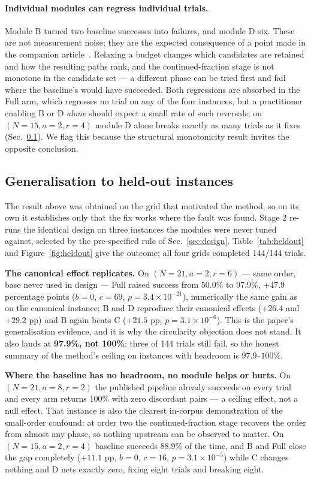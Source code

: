 \documentclass[preprint,11pt]{elsarticle}
\begin{document}
\paragraph{Individual modules can regress individual trials.} Module B
turned two baseline successes into failures, and module D six. These are
not measurement noise; they are the expected consequence of a point made
in the companion article~\cite{methodpaper}. Relaxing a budget changes which
candidates are retained and how the resulting paths rank, and the
continued-fraction stage is not monotone in the candidate set --- a
different phase can be tried first and fail where the baseline's would
have succeeded. Both regressions are absorbed in the Full arm, which
regresses no trial on any of the four instances, but a practitioner
enabling B or D \emph{alone} should expect a small rate of such
reversals; on $(N{=}15,a{=}2,r{=}4)$ module D alone breaks exactly as
many trials as it fixes (Sec.~\ref{sec:heldout}). We flag this because
the structural monotonicity result invites the opposite conclusion.

\subsection{Generalisation to held-out instances}
\label{sec:heldout}

The result above was obtained on the grid that motivated the method, so
on its own it establishes only that the fix works where the fault was
found. Stage 2 re-runs the identical design on three instances the
modules were never tuned against, selected by the pre-specified rule of
Sec.~\ref{sec:design}. Table~\ref{tab:heldout} and
Figure~\ref{fig:heldout} give the outcome; all four grids completed
144/144 trials.

\textbf{The canonical effect replicates.} On $(N{=}21,a{=}2,r{=}6)$ ---
same order, base never used in design --- Full raised success from 50.0\%
to 97.9\%, $+47.9$ percentage points ($b{=}0$, $c{=}69$,
$p=3.4\times10^{-21}$), numerically the same gain as on the canonical
instance; B and D reproduce their canonical effects ($+26.4$ and
$+29.2$ pp) and B again beats C ($+21.5$ pp, $p=3.1\times10^{-6}$). This
is the paper's generalisation evidence, and it is why the circularity
objection does not stand. It also lands at \textbf{97.9\%, not 100\%}:
three of 144 trials still fail, so the honest summary of the method's
ceiling on instances with headroom is $97.9$--$100\%$.

\textbf{Where the baseline has no headroom, no module helps or hurts.} On
$(N{=}21,a{=}8,r{=}2)$ the published pipeline already succeeds on every
trial and every arm returns 100\% with zero discordant pairs --- a ceiling
effect, not a null effect. That instance is also the clearest in-corpus
demonstration of the small-order confound: at order two the
continued-fraction stage recovers the order from almost any phase, so
nothing upstream can be observed to matter. On $(N{=}15,a{=}2,r{=}4)$
baseline succeeds 88.9\% of the time, and B and Full close the gap
completely ($+11.1$ pp, $b{=}0$, $c{=}16$, $p=3.1\times10^{-5}$) while C
changes nothing and D nets exactly zero, fixing eight trials and breaking
eight.
\end{document}
